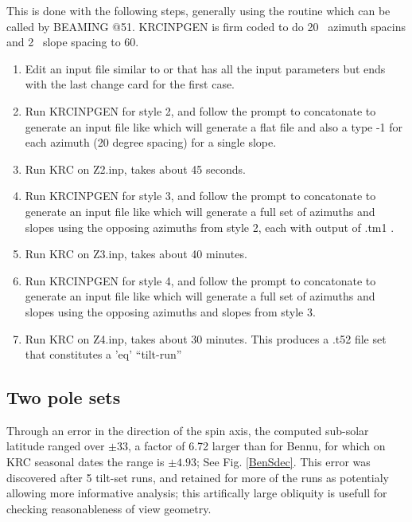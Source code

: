 \documentclass{article}
\begin{document}
This is done with the following steps, generally using the routine
 which can be called by BEAMING @51. KRCINPGEN is firm coded
to do 20\qd~ azimuth spacins and 2\qd~ slope spacing to 60\qd.
\begin{enumerate} %

\item Edit an input file similar to  or  that has all
  the input parameters but ends with the last change card for the first case.

\item Run KRCINPGEN for style 2, and follow the prompt to concatonate to
  generate an input file like  which will generate a flat file and
  also a type -1 for each azimuth (20 degree spacing) for a single slope.

\item Run KRC on Z2.inp, takes about 45 seconds.

\item Run KRCINPGEN for style 3, and follow the prompt to concatonate to
  generate an input file like  which will generate a full set of azimuths and slopes using the opposing azimuths from style 2, each with output of .tm1 .

\item Run KRC on Z3.inp, takes about  40 minutes.

\item Run KRCINPGEN for style 4, and follow the prompt to concatonate to
  generate an input file like  which will generate a full set of azimuths and slopes using the opposing azimuths and slopes from style 3.

\item Run KRC on Z4.inp, takes about 30 minutes. This produces a .t52 file set that constitutes a  'eq'  ``tilt-run'' 

\end{enumerate} 


\subsection{Two pole sets}

Through an error in the direction of the spin axis, the computed sub-solar
latitude ranged over $\pm 33$\qd, a factor of 6.72 larger than for Bennu, for
which on KRC seasonal dates the range is $\pm 4.93$\qd; See
Fig. \ref{BenSdec}. This error was discovered after 5 tilt-set runs, and
retained for more of the runs as potentialy allowing more informative
analysis; this artifically large obliquity is usefull for checking reasonableness of view geometry. 
\end{document}
